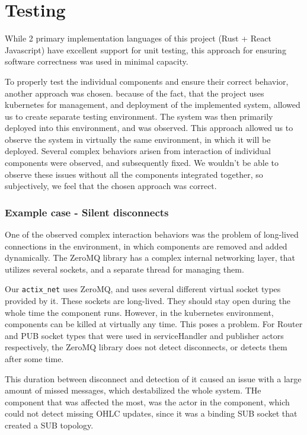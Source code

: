 \section{Testing}
While 2 primary implementation languages of this project (Rust + React Javascript) have excellent support for unit testing,
this approach for ensuring software correctness was used in minimal capacity.

To properly test the individual components and ensure their correct behavior, another approach was chosen. because of the
fact, that the project uses kubernetes for management, and deployment of the implemented system, allowed us to create
separate testing environment. The system was then primarily deployed into this environment, and was observed.
This approach allowed us to observe the system in virtually the same environment, in which it will be deployed.
Several complex behaviors arisen from interaction of individual components were observed, and subsequently fixed.
We wouldn't be able to observe these issues without all the components integrated together, so subjectively, we
feel that the chosen approach was correct.

\subsubsection{Example case - Silent disconnects}
One of the observed complex interaction behaviors was the problem of long-lived connections in the environment, in
which components are removed and added dynamically.
The ZeroMQ library has a complex internal networking layer, that utilizes several sockets, and a separate thread
for managing them.

Our \verb|actix_net| uses ZeroMQ, and uses several different virtual socket types provided by it. These sockets
are long-lived. They should stay open during the whole time the component runs. However, in the kubernetes environment,
components can be killed at virtually any time. This poses a problem. For Router and PUB socket types that were
used in serviceHandler and publisher actors respectively, the ZeroMQ library does not detect disconnects, or detects
them after some time.

This duration between disconnect and detection of it caused an issue with a large amount of missed messages, which
destabilized the whole system. THe component that was affected the most, was the  actor in the 
component, which could not detect missing OHLC updates, since it was a binding SUB socket that created a SUB topology.

